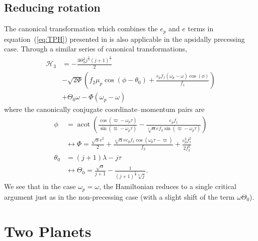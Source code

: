 \documentclass{article}
\begin{document}
\subsection{Reducing rotation}
The canonical transformation which combines the $e_p$ and $e$ terms in equation~(\ref{eq:TPH}) presented in \citet{wisdom_canonical_1986} \citep[c.f.][]{moutamid14_coupl_between_corot_lindb_reson,laune22_apsid_align_anti_align_planet} is also applicable in the apsidally precessing case.
Through a similar series of canonical transformations,
\begin{align}
    \mathcal H_3
     & =- \frac{3 \Theta_{0}^{2} j^{\frac{2}{3}} \left(j + 1\right)^{\frac{4}{3}}}{2}\nonumber                                                                                   \\
     & -\sqrt{2\Phi} \left(f_{2} \mu_{p} \cos{\left(\phi - \theta_{0} \right)}+\frac{ e_{p} f_{1} \left(\omega_p-\omega\right) \cos{\left(\phi \right)}}{f_{1}}\right) \nonumber \\
     & +\Theta_{0} \omega- \Phi \left(\omega_p - \omega\right)
\end{align}
where the canonically conjugate coordinate--momentum pairs are
\begin{align}
    \phi       & = \operatorname{acot}{\left(\frac{\cos{\left(\varpi-\omega_p \tau \right)}}{\sin{\left(\varpi-\omega_p \tau  \right)}} - \frac{e_{p} f_{1}}{\sqrt[4]{\alpha} e f_{2} \sin{\left(\varpi-\omega_p \tau  \right)}} \right)} \\
               & \longleftrightarrow\Phi = \frac{\sqrt{\alpha} e^{2}}{2} + \frac{\sqrt[4]{\alpha} e e_{p} f_{1} \cos{\left(\omega_p \tau - \varpi \right)}}{f_{2}}  + \frac{e_{p}^{2} f_{1}^{2}}{2 f_{2}^{2}}                             \\
    \theta_{0} & = (j+1) \lambda - j\tau                                                                                                                                                                                                  \\
               & \longleftrightarrow\Theta_{0} = \frac{\sqrt{\alpha}}{j+1} - \frac{1}{(j+1)^{\frac{2}{3}} \sqrt[3]{j}}.
\end{align}
We see that in the case $\omega_p=\omega$, the Hamiltonian reduces to a single critical argument just as in the non-precessing case (with a slight shift of the term $\omega\Theta_0$).

\section{Two Planets}
\end{document}
